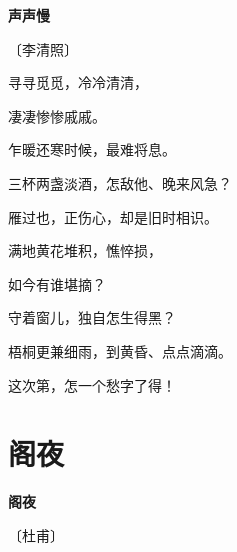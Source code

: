 \documentclass[12pt,UTF-8,openany,fontset=none]{ctexbook}
\begin{document}

\begin{center}
    {\bfseries 声声慢}

    \vspace{18pt}

    \begin{large}\xuwen
        〔李清照〕
    \end{large}

\end{center}

    \vspace{18pt}  %

\begin{center}
    \begin{Large}

        寻寻觅觅，冷冷清清，

        凄凄惨惨戚戚。

        乍暖还寒时候，最难将息。

        三杯两盏淡酒，怎敌他、晚来风急？

        雁过也，正伤心，却是旧时相识。

        \vspace{18pt}  %

        满地黄花堆积，憔悴损，

        如今有谁堪摘？

        守着窗儿，独自怎生得黑？

        梧桐更兼细雨，到黄昏、点点滴滴。

        这次第，怎一个愁字了得！

    \end{Large}

\end{center}

\vspace{8pt}
\clearpage

\section{阁夜}


\begin{center}
    {\bfseries 阁夜}

    \vspace{18pt}

    \begin{large}\xuwen
        〔杜甫〕
    \end{large}

\end{center}
\end{document}
